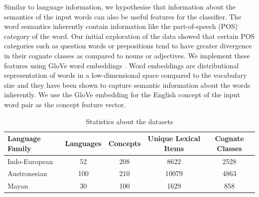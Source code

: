 \documentclass[11pt,letterpaper]{article}
\begin{document}
Similar to language information, we hypothesise that information about the semantics of the input words can also be useful features for the classifier. The word semantics inherently contain information like the part-of-speech (POS) category of the word. Our initial exploration of the data showed that certain POS categories such as question words or prepositions tend to have greater divergence in their cognate classes as compared to nouns or adjectives.  
We implement these features using GloVe word embeddings \cite{pennington2014glove}. Word embeddings are distributional representation of words in a low-dimensional space compared to the vocabulary size and they have been shown to capture semantic information about the words inherently. We use the GloVe embedding for the English concept of the input word pair as the concept feature vector.

\begin{table}[ht]
\centering
\begin{tabular}{lcccc}
Language Family & Languages & Concepts & Unique Lexical Items & Cognate Classes \\ \hline
Indo-European   & 52        & 208      & 8622                & 2528            \\
Austronesian    & 100       & 210      & 10079                & 4863            \\
Mayan           & 30        & 100      & 1629                 & 858            
\end{tabular}
\caption{Statistics about the datasets}
\label{datastat}
\end{table}
\end{document}

